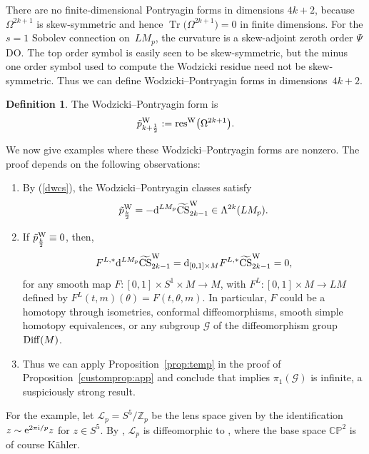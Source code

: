 \documentclass[10pt,a4paper]{amsart}
\numberwithin{equation}{section}
\theoremstyle{definition}
\newtheorem{Definition}[Theorem]{Definition}
\newcommand{\BbZ}{{\mathbb Z}}
\newcommand{\diff}{{\rm Diff} }
\newcommand{\Z}{\BbZ}
\newcommand{\calL}{\mathcal{L}}
\newcommand{\resw}{{\rm res}^{\rm W}}
\newcommand{\bm}{ M}
\newcommand{\ocs}{\widetilde{{\rm CS}}}
\newcommand{\tp}{\tilde p}
\newcommand{\omp}{M_p}
\newcommand{\itm}{[0,1]\times M}
\begin{document}
There are no finite-dimensional Pontryagin forms in dimensions $4k+2$, because $\Omega^{2k+1}$ is skew-symmetric and hence
$\operatorname{Tr}\bigl(\Omega^{2k+1}\bigr) =0$ in finite dimensions. For the $s=1$ Sobolev connection on~$L\omp$, the curvature is a skew-adjoint zeroth order $\Psi$DO. The top order symbol is easily seen to be skew-symmetric, but the minus one order symbol used to compute the Wodzicki residue need not be skew-symmetric. Thus we can define Wodzicki--Pontryagin forms in dimensions~${4k+2}$.

\begin{Definition} The Wodzicki--Pontryagin form \smash{$\tp^{\rm W}_{k+\frac{1}{2}}\in \Lambda^{4k+2}(L\omp)$} is
\[\tp^{\rm W}_{k+\frac{1}{2}} :=
\resw\bigl(\Omega^{2k+1}\bigr).\]
\end{Definition}

 We now give examples where these Wodzicki--Pontryagin forms are nonzero. The proof depends on the following observations:
 \begin{enumerate}\itemsep=0pt
 \item By (\ref{dwcs}),
the Wodzicki--Pontryagin classes satisfy
 \begin{equation*}%
 \tp^{\rm W}_{\frac{k}{2}} = -{\rm d}^{LM_p}\ocs^{\rm W}_{2k-1}\in \Lambda^{2k}(LM_p).
 \end{equation*}
 \item If $\tp^{\rm W}_{\frac{k}{2}} \equiv 0$, then,
 \[F^{L,*} {\rm d}^{LM_p}\ocs^{\rm W}_{2k-1} = {\rm d}_{\itm}F^{L,*}\ocs^{\rm W}_{2k-1} =0,\]
for any smooth map
$F\colon [0,1]\times S^1\times \bm\to \bm$, with
$F^L\colon [0,1]\times \bm\to L\bm$ defined by $ F^L(t,m)(\theta) = F(t,\theta, m)$. In particular, $F$ could be a homotopy through isometries, conformal diffeomorphisms, smooth simple homotopy equivalences, or any subgroup $\mathcal{G}$ of the diffeomorphism group $\diff(M)$.
\item Thus we can apply
Proposition~\ref{prop:temp} in the proof of Proposition~\ref{customprop:app} and conclude that \smash{$a^{L,*}\ocs{}^{\rm W}_{2k-1}(g) \neq 0$} implies $\pi_1(\mathcal{G})$ is infinite, a suspiciously strong result.
 \end{enumerate}

For the example, let $\calL_p = S^5/\Z_p$ be the lens space given by the identification $z \sim {\rm e}^{2\pi {\rm i}/p}z$ for $
z\in S^5$.
By \cite[Proposition 3.14]{MRT4}, $\calL_p$ is diffeomorphic to , where the base space $\mathbb{CP}^2$ is of course K\"ahler.
\end{document}
